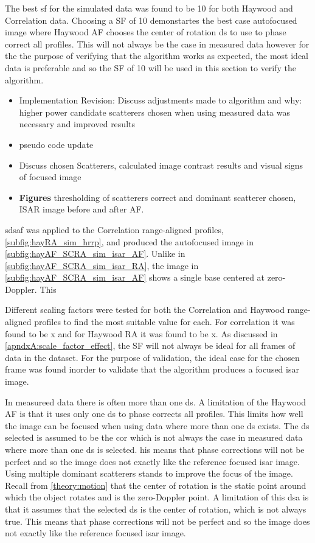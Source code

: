 \documentclass[class=report,11pt,crop=false]{standalone}
\begin{document}
    The best \gls{sf} for the simulated data was found to be 10 for both Haywood and Correlation data. Choosing a SF of 10 demonstartes the best case autofocused image where Haywood AF chooses the center of rotation \gls{ds} to use to phase correct all profiles. This will not always be the case in measured data however for the the purpose of verifying that the algorithm works as expected, the most ideal data is preferable and so the SF of 10 will be used in this section to verify the algorithm.
    
    \begin{itemize}
        \item Implementation Revision: Discuss adjustments made to algorithm and why: higher power candidate scatterers chosen when using measured data was necessary and improved results
        \item pseudo code update
        \item Discuss chosen Scatterers, calculated image contrast results and visual signs of focused image
        \item \textbf{Figures} thresholding of scatterers correct and dominant scatterer chosen, ISAR image before and after AF.
    \end{itemize}

    \gls{sdsaf} was applied to the Correlation range-aligned profiles, \autoref{subfig:hayRA_sim_hrrp}, and produced the autofocused image in \autoref{subfig:hayAF_SCRA_sim_isar_AF}. Unlike in \autoref{subfig:hayAF_SCRA_sim_isar_RA}, the image in \autoref{subfig:hayAF_SCRA_sim_isar_AF} shows a single base centered at zero-Doppler. This 
    
    Different scaling factors were tested for both the Correlation and Haywood range-aligned profiles to find the most suitable value for each. For correlation it was found to be x and for Haywood RA it was found to be x. As discussed in \autoref{apndxA:scale_factor_effect}, the SF will not always be ideal for all frames of data in the dataset. For the purpose of validation, the ideal case for the chosen frame was found inorder to validate that the algorithm produces a focused \gls{isar} image.

    In measureed data there is often more than one \gls{ds}. A limitation of the Haywood AF is that it uses only one \gls{ds} to phase corrects all profiles. This limits how well the image can be focused when using data where more than one \gls{ds} exists. %
    The \gls{ds} selected is assumed to be the cor which is not always the case in measured data where more than one \gls{ds} is selected. his means that phase corrections will not be perfect and so the image does not exactly like the reference focused isar image. Using multiple dominant scatterers stands to improve the focus of the image.
    Recall from \autoref{theory:motion} that the center of rotation is the static point around which the object rotates and is the zero-Doppler point. A limitation of this \gls{dsa} is that it assumes that the selected \gls{ds} is the center of rotation, which is not always true. This means that phase corrections will not be perfect and so the image does not exactly like the reference focused isar image.
\end{document}
